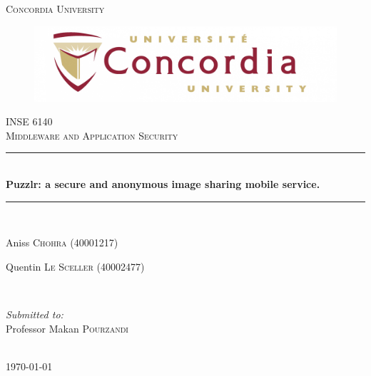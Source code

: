 \begin{titlepage}
 \newcommand{\HRule}{\rule{\linewidth}{0.5mm}}
 \center
 
 
 \textsc{\LARGE Concordia University}\\[1.5cm]
 \begin{figure}[h]
 \centering
 \includegraphics[width=12cm]{concordia}
 \end{figure}

 \textsc{\large INSE 6140}\\[0.5cm]
 \textsc{\large Middleware and Application Security}
 
 
 \HRule \\[0.4cm]
 {
  \Huge \bfseries Puzzlr: a secure and anonymous image sharing mobile service.
 }
 \HRule \\[1.5cm]
 
 
 \begin{minipage}{1\textwidth}
  \begin{flushleft}
   \center Aniss \textsc{Chohra} (40001217)
  \end{flushleft}
  \begin{flushleft}
   \center Quentin \textsc{Le Sceller} (40002477)
  \end{flushleft}


 \end{minipage}
 ~
 \newline
 \newline
 
 
 \begin{minipage}{1\textwidth}
 
  \begin{flushleft}
   \emph{Submitted to:} \\
   Professor Makan \textsc{Pourzandi}
  \end{flushleft}

 \end{minipage}\\[4cm]
 
 
 {\large \today}\\[3cm]
 
 \vfill


\end{titlepage}

